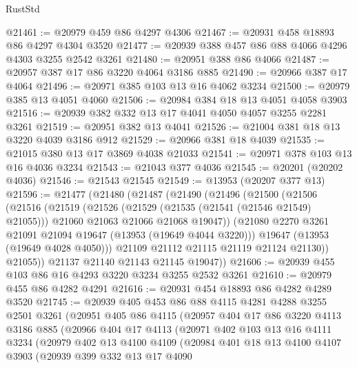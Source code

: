 \begin{lexlean}{RustStd}
\begin{coremodule}
@21461 := @20979 @459 @86 @4297 @4306
@21467 := @20931 @458 @18893 @86 @4297 @4304 @3520
@21477 := @20939 @388 @457 @86 @88 @4066 @4296 @4303 @3255 @2542 @3261
@21480 := @20951 @388 @86 @4066
@21487 := @20957 @387 @17 @86 @3220 @4064 @3186 @885
@21490 := @20966 @387 @17 @4064
@21496 := @20971 @385 @103 @13 @16 @4062 @3234
@21500 := @20979 @385 @13 @4051 @4060
@21506 := @20984 @384 @18 @13 @4051 @4058 @3903
@21516 := @20939 @382 @332 @13 @17 @4041 @4050 @4057 @3255 @2281 @3261
@21519 := @20951 @382 @13 @4041
@21526 := @21004 @381 @18 @13 @3220 @4039 @3186 @912
@21529 := @20966 @381 @18 @4039
@21535 := @21015 @380 @13 @17 @3869 @4038 @21033
@21541 := @20971 @378 @103 @13 @16 @4036 @3234
@21543 := @21043 @377 @4036
@21545 := @20201 (@20202 @4036)
@21546 := @21543 @21545
@21549 := @13953 (@20207 @377 @13)
@21596 := @21477
    (@21480
      (@21487
        (@21490
          (@21496
            (@21500
              (@21506
                (@21516
                  (@21519
                    (@21526
                      (@21529 (@21535 (@21541 (@21546 @21549) @21055)))
                      @21060
                      @21063
                      @21066
                      @21068
                      @19047))
                  (@21080 @2270 @3261 @21091 @21094 @19647 (@13953 (@19649 @4044 @3220)))
                  @19647
                  (@13953 (@19649 @4028 @4050)))
                @21109
                @21112
                @21115
                @21119
                @21124
                @21130))
            @21055))
        @21137
        @21140
        @21143
        @21145
        @19047))
@21606 := @20939 @455 @103 @86 @16 @4293 @3220 @3234 @3255 @2532 @3261
@21610 := @20979 @455 @86 @4282 @4291
@21616 := @20931 @454 @18893 @86 @4282 @4289 @3520
@21745 := @20939
    @405
    @453
    @86
    @88
    @4115
    @4281
    @4288
    @3255
    @2501
    @3261
    (@20951
      @405
      @86
      @4115
      (@20957
        @404
        @17
        @86
        @3220
        @4113
        @3186
        @885
        (@20966
          @404
          @17
          @4113
          (@20971
            @402
            @103
            @13
            @16
            @4111
            @3234
            (@20979
              @402
              @13
              @4100
              @4109
              (@20984
                @401
                @18
                @13
                @4100
                @4107
                @3903
                (@20939
                  @399
                  @332
                  @13
                  @17
                  @4090

\end{coremodule}
\end{lexlean}
